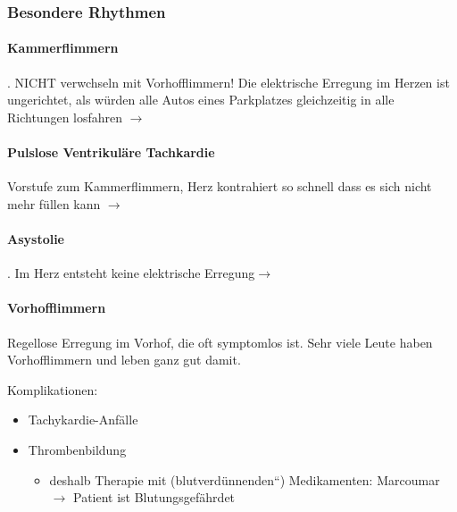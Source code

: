 \subsubsection{Besondere Rhythmen}

\paragraph[Kammerflimmern]{Kammerflimmern}

. NICHT verwchseln mit Vorhofflimmern! Die
elektrische Erregung im Herzen ist ungerichtet, als w\"urden alle Autos 
eines Parkplatzes gleichzeitig in alle Richtungen losfahren 
${\rightarrow}$  
    

\paragraph{Pulslose Ventrikuläre Tachkardie}
 Vorstufe zum Kammerflimmern, Herz kontrahiert so
schnell dass es sich nicht mehr f\"ullen kann ${\rightarrow}$  
    
\paragraph{Asystolie}
. Im Herz entsteht keine elektrische
Erregung$\rightarrow$   
    
\paragraph[Vorhofflimmern]{Vorhofflimmern}

Regellose Erregung im Vorhof, die oft symptomlos ist. 
Sehr viele Leute haben Vorhofflimmern und leben ganz gut damit.

Komplikationen:
\begin{itemize}
    \item Tachykardie-Anfälle
    \item Thrombenbildung
    \begin{itemize}
        \item deshalb Therapie mit 
        ({\quotedblbase}blutverd\"unnenden{\textquotedblleft}) Medikamenten:
        Marcoumar ${\rightarrow}$ Patient ist Blutungsgefährdet
    \end{itemize}
\end{itemize}

